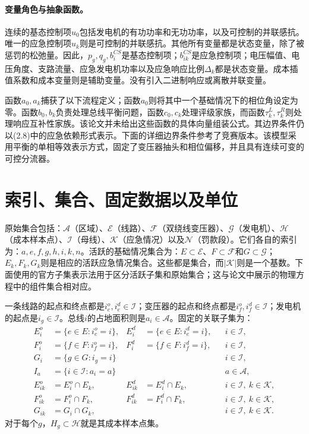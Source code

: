 \documentclass{article}
\begin{document}
\paragraph{变量角色与抽象函数。}
连续的基态控制项$u_0$包括发电机的有功功率和无功功率，以及可控制的并联感抗。唯一的应急控制项$u_k$则是可控制的并联感抗。其他所有变量都是状态变量，除了被惩罚的松弛量。因此，$p_g,q_g,b_i^{CS}$是基态控制项；$b_{ik}^{CS}$是应急控制项；电压幅值、电压角度、支路流量、应急发电机功率以及应急响应比例$\Delta_k$都是状态变量。成本插值系数和成本变量则是辅助变量。没有引入二进制响应或离散并联变量。

函数$a_0,a_k$捕获了以下流程定义；函数$a_0$则将其中一个基础情况下的相位角设定为零。函数$b_0,b_k$负责处理总线平衡问题，函数$c_0,c_k$处理评级家族，而函数$\tau_k^L,\tau_k^R$则处理响应互补性家族。该论文并未给出这些函数的具体向量组装公式。其边界条件仍以(2.8)中的应急依赖形式表示。下面的详细边界条件参考了竞赛版本。该模型采用平衡的单相等效表示方式，固定了变压器抽头和相位偏移，并且具有连续可变的可控分流器。

\section*{索引、集合、固定数据以及单位}
原始集合包括：$\mathcal A$（区域）、$\mathcal E$（线路）、$\mathcal F$（双绕线变压器）、$\mathcal G$（发电机）、$\mathcal H$（成本样本点）、$\mathcal I$（母线）、$\mathcal K$（应急情况）以及$\mathcal N$（罚款段）。它们各自的索引为：$a,e,f,g,h,i,k,n$。活跃的基础情况集合为：$E\subset\mathcal E$、$F\subset\mathcal F$和$G\subset\mathcal G$；$E_k,F_k,G_k$则是相应的活跃应急情况集合。这些都是集合，而$|\mathcal K|$则是一个基数。下面使用的官方子集表示法用于区分活跃子集和原始集合；这与论文中展示的物理方程中的组件集合相对应。

一条线路的起点和终点都是$i_e^o,i_e^d\in\mathcal I$；变压器的起点和终点都是$i_f^o,i_f^d\in\mathcal I$；发电机的起点是$i_g\in\mathcal I$。总线$i$的占地面积则是$a_i\in\mathcal A$。固定的关联子集为：
\begin{align*}
E_i^o&=\{e\in E:i_e^o=i\},&E_i^d&=\{e\in E:i_e^d=i\},&&i\in\mathcal I,\\
F_i^o&=\{f\in F:i_f^o=i\},&F_i^d&=\{f\in F:i_f^d=i\},&&i\in\mathcal I,\\
G_i&=\{g\in G:i_g=i\} &&&&i\in\mathcal I,\\
I_a&=\{i\in\mathcal I:a_i=a\} &&&&a\in\mathcal A,\\
E_{ik}^o&=E_i^o\cap E_k,&E_{ik}^d&=E_i^d\cap E_k,&&i\in\mathcal I,\ k\in\mathcal K,\\
F_{ik}^o&=F_i^o\cap F_k,&F_{ik}^d&=F_i^d\cap F_k,&&i\in\mathcal I,\ k\in\mathcal K,\\
G_{ik}&=G_i\cap G_k,&&&&i\in\mathcal I,\ k\in\mathcal K.
\end{align*}
对于每个$g$，$H_g\subset\mathcal H$就是其成本样本点集。
\end{document}
